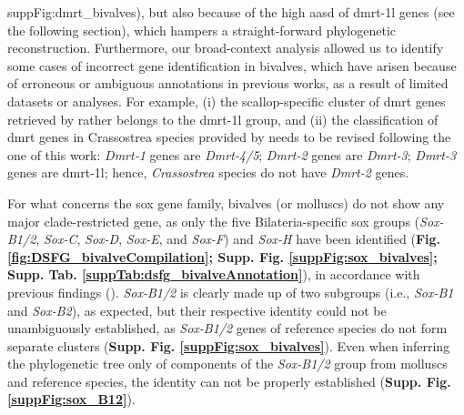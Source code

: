\documentclass[../main.tex]{subfiles}
\begin{document}
{	{suppFig:dmrt_bivalves}}), but also because of the high \gls{aasd} of \gls{dmrt-1l} genes (see the following section), which hampers a straight-forward phylogenetic reconstruction. Furthermore, our broad-context analysis allowed us to identify some cases of incorrect gene identification in bivalves, which have arisen because of erroneous or ambiguous annotations in previous works, as a result of limited datasets or analyses. For example, (i) the scallop-specific cluster of \gls{dmrt} genes retrieved by \textbf{\cite{wang2023genome}} rather belongs to the \gls{dmrt-1l} group, and (ii) the classification of \gls{dmrt} genes in Crassostrea species provided by \textbf{\cite{zeng2024genome}} needs to be revised following the one of this work: \textit{Dmrt-1} genes are \textit{Dmrt-4/5}; \textit{Dmrt-2} genes are \textit{Dmrt-3}; \textit{Dmrt-3} genes are \gls{dmrt-1l}; hence, \textit{Crassostrea} species do not have \textit{Dmrt-2} genes.

For what concerns the \gls{sox} gene family, bivalves (or molluscs) do not show any major clade-restricted gene, as only the five Bilateria-specific \gls{sox} groups (\textit{Sox-B1/2}, \textit{Sox-C}, \textit{Sox-D}, \textit{Sox-E}, and \textit{Sox-F}) and \textit{Sox-H} have been identified (\textbf{Fig. \ref{fig:DSFG_bivalveCompilation}; Supp. Fig. \ref{suppFig:sox_bivalves}; Supp. Tab. \ref{suppTab:dsfg_bivalveAnnotation}}), in accordance with previous findings (\textbf{\cite{yu2017genome,evensen2022comparative, wang2024genome}}). \textit{Sox-B1/2} is clearly made up of two subgroups (i.e., \textit{Sox-B1} and \textit{Sox-B2}), as expected, but their respective identity could not be unambiguously established, as \textit{Sox-B1/2} genes of reference species do not form separate clusters (\textbf{Supp. Fig. \ref{suppFig:sox_bivalves}}). Even when inferring the phylogenetic tree only of components of the \textit{Sox-B1/2} group from molluscs and reference species, the identity can not be properly established (\textbf{Supp. Fig. \ref{suppFig:sox_B12}}).
\end{document}
